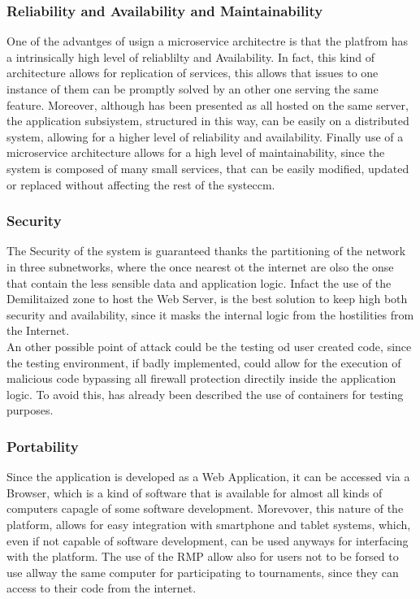 \subsubsection{Reliability and Availability and Maintainability}
One of the advantges of usign a microservice architectre is that the platfrom has a intrinsically high level of reliablilty and Availability. 
In fact, this kind of architecture allows for replication of services, this allows that issues to one instance of them can be promptly solved by an other one serving the same feature. 
Moreover, although has been presented as all hosted on the same server, the application subsiystem, structured in this way, can be easily on a distributed system, allowing for a higher level of reliability and availability.
Finally use of a microservice architecture allows for a high level of maintainability, since the system is composed of many small services, that can be easily modified, updated or replaced without affecting the rest of the systeccm.\\
\subsubsection{Security}
The Security of the system is guaranteed thanks the partitioning of the network in three subnetworks, where the once nearest ot the internet are olso the onse that contain the less sensible data and application logic. Infact the use of the Demilitaized zone to host the Web Server, is the best solution to keep high both security and availability, since it masks the internal logic from the hostilities from the Internet.\\ 
An other possible point of attack could be the testing od user created code, since the testing environment, if badly implemented, could allow for the execution of malicious code bypassing all firewall protection directily inside the application logic. 
To avoid this, has already been described the use of containers for testing purposes.
\subsubsection{Portability}
Since the application is developed as a Web Application, it can be accessed via a Browser, which is a kind of software that is available for almost all kinds of computers capagle of some software development. 
Morevover, this nature of the platform, allows for easy integration with smartphone and tablet systems, which, even if not capable of software development, can be used anyways for interfacing with the platform.
The use of the RMP allow also for users not to be forsed to use allway the same computer for participating to tournaments, since they can access to their code from the internet.